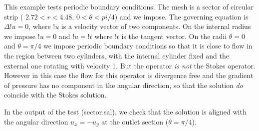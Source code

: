 
This example tests periodic boundary conditions. The mesh is a sector
of circular strip ( $2.72 < r < 4.48$, $0 < \theta < pi/4$) and we
impose. The governing equation is $\Delta !u=0$, where $!u$ is a
velocity vector of two components.  On the internal radius we impose
$!u=0$ and $!u=!t$ where $!t$ is the tangent vector. On the radii
$\theta=0$ and $\theta=\pi/4$ we impose periodic boundary conditions
so that it is close to flow in the region between two cylinders, with
the internal cylinder fixed and the external one rotating with
velocity 1. But the operator \emph{is not} the Stokes
operator. However in this case the flow for this operator is
divergence free and the gradient of pressure has no component in the
angular direction, so that the solution \emph{do} coincide with the
Stokes solution.

In the output of the test (sector.sal), we check that the solution
is aligned with the angular direction $u_x=-u_y$ at the outlet
section ($\theta = \pi/4$).

